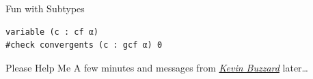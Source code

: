 \documentclass{beamer}
\begin{document}
\begin{frame}[fragile]{Fun with Subtypes}
\begin{onlyenv}
\begin{verbatim}
variable (c : cf α)
#check convergents (c : gcf α) 0
\end{verbatim}
\end{onlyenv}
\end{frame}
\begin{frame}{Please Help Me}
    \center A few minutes and messages from \href{http://wwwf.imperial.ac.uk/~buzzard/}{\emph{Kevin Buzzard}} later\dots
\end{frame}
\end{document}
